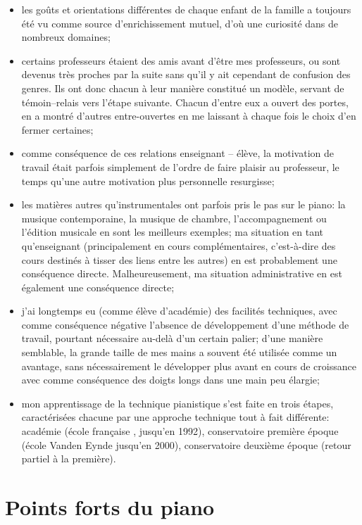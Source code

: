 \begin{itemize}
\item les goûts et orientations différentes de chaque enfant de la famille a toujours été vu comme source d'enrichissement mutuel, d'où une curiosité dans de nombreux domaines;
\item certains professeurs étaient des amis avant d'être mes professeurs, ou sont devenus très proches par la suite sans qu'il y ait cependant de confusion des genres. Ils ont donc chacun à leur manière constitué un modèle, servant de témoin--relais vers l'étape suivante. Chacun d'entre eux a ouvert des portes, en a montré d'autres entre-ouvertes en me laissant à chaque fois le choix d'en fermer certaines;
\item comme conséquence de ces relations enseignant -- élève, la motivation de travail était parfois simplement de l'ordre de \og{} faire plaisir au professeur\fg{}, le temps qu'une autre motivation plus personnelle resurgisse;
\item les matières autres qu'instrumentales ont parfois pris le pas sur le piano: la musique contemporaine, la musique de chambre, l'accompagnement ou l'édition musicale en sont les meilleurs exemples; ma situation en tant qu'enseignant (principalement en cours complémentaires, c'est-à-dire des cours destinés à tisser des liens entre les autres) en est probablement une conséquence directe. Malheureusement, ma situation administrative en est également une conséquence directe;
\item j'ai longtemps eu (comme élève d'académie) des facilités techniques, avec comme conséquence négative l'absence de développement d'une méthode de travail, pourtant nécessaire au-delà d'un certain palier; d'une manière semblable, la grande taille de mes mains a souvent été utilisée comme un avantage, sans nécessairement le développer plus avant en cours de croissance avec comme conséquence des doigts longs dans une main peu élargie;
\item mon apprentissage de la technique pianistique s'est faite en trois étapes, caractérisées chacune par une approche technique tout à fait différente: académie (école \og{} française \fg{}, jusqu'en 1992), conservatoire \og{} première époque \fg{} (école \og{} Vanden Eynde \fg{} jusqu'en 2000), conservatoire \og{} deuxième époque \fg{} (retour partiel à la première).
\end{itemize}


\section*{Points forts du piano}

